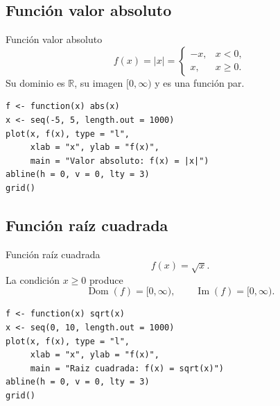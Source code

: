 \documentclass[aspectratio=169,10pt]{beamer}
\newcommand{\R}{\mathbb{R}}
\newcommand{\Dom}{\operatorname{Dom}}
\newcommand{\Ima}{\operatorname{Im}}
\begin{document}
\subsection*{Función valor absoluto}
\begin{frame}{Función valor absoluto}
\[
f(x)=|x|=
\begin{cases}
-x,&x<0,\\
x,&x\geq0.
\end{cases}
\]
Su dominio es $\R$, su imagen $[0,\infty)$ y es una función par.

\begin{center}
\end{center}

\begin{verbatim}
f <- function(x) abs(x)
x <- seq(-5, 5, length.out = 1000)
plot(x, f(x), type = "l",
     xlab = "x", ylab = "f(x)",
     main = "Valor absoluto: f(x) = |x|")
abline(h = 0, v = 0, lty = 3)
grid()
\end{verbatim}

\end{frame}
\subsection*{Función raíz cuadrada}
\begin{frame}{Función raíz cuadrada}
\[
f(x)=\sqrt{x}.
\]
La condición $x\geq0$ produce
\[
\Dom(f)=[0,\infty),\qquad \Ima(f)=[0,\infty).
\]

\begin{center}
\end{center}

\begin{verbatim}
f <- function(x) sqrt(x)
x <- seq(0, 10, length.out = 1000)
plot(x, f(x), type = "l",
     xlab = "x", ylab = "f(x)",
     main = "Raiz cuadrada: f(x) = sqrt(x)")
abline(h = 0, v = 0, lty = 3)
grid()
\end{verbatim}

\end{frame}
\end{document}
